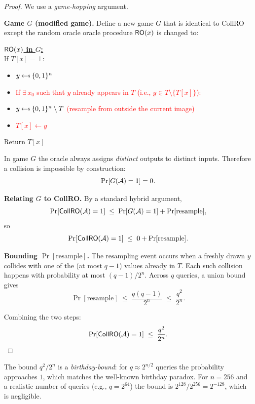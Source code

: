 \documentclass[11pt]{article}
\begin{document}
\begin{proof}
We use a \emph{game-hopping} argument.

\medskip
\noindent\textbf{Game $G$ (modified game).}
Define a new game $G$ that is identical to \textsf{CollRO} except the random
oracle oracle procedure $\mathsf{RO}(x)$ is changed to:

\begin{tcolorbox}[colback=gray!8, colframe=gray!50]
\textbf{\underline{$\mathsf{RO}(x)$ in $G$:}}\\
If $T[x] = \bot$:
\begin{itemize}[leftmargin=2em, topsep=2pt, itemsep=0pt]
  \item $y \getsr \{0,1\}^n$
  \item \textcolor{red}{If $\exists\, x_0$ such that $y$ already appears in
        $T$ (i.e., $y \in T \setminus \{T[x]\}$):}
  \item \textcolor{red}{\quad $y \getsr \{0,1\}^n \setminus T$ \quad
        (resample from outside the current image)}
  \item \textcolor{red}{\quad $T[x] \leftarrow y$}
\end{itemize}
Return $T[x]$
\end{tcolorbox}

\noindent In game $G$ the oracle always assigns \emph{distinct} outputs to
distinct inputs. Therefore a collision is impossible by construction:
\[
  \Pr[G(\mathcal{A}) = 1] = 0.
\]

\noindent\textbf{Relating $G$ to \textsf{CollRO}.}
By a standard hybrid argument,
\[
  \Pr[\textsf{CollRO}(\mathcal{A}) = 1]
  \;\le\;
  \Pr[G(\mathcal{A}) = 1] + \Pr[\text{resample}],
\]
so
\[
  \Pr[\textsf{CollRO}(\mathcal{A}) = 1] \;\le\; 0 + \Pr[\text{resample}].
\]

\noindent\textbf{Bounding $\Pr[\text{resample}]$.}
The resampling event occurs when a freshly drawn $y$ collides with one of the
(at most $q-1$) values already in $T$.  Each such collision happens with
probability at most $(q-1)/2^n$.  Across $q$ queries, a union bound gives
\[
  \Pr[\text{resample}] \;\le\; \frac{q(q-1)}{2^n} \;\le\; \frac{q^2}{2^n}.
\]

\noindent Combining the two steps:
\[
  \Pr[\textsf{CollRO}(\mathcal{A}) = 1]
  \;\le\;
  \frac{q^2}{2^n}. \qedhere
\]
\end{proof}

\begin{remark}
The bound $q^2/2^n$ is a \emph{birthday-bound}: for $q \approx 2^{n/2}$
queries the probability approaches $1$, which matches the well-known birthday
paradox.  For $n = 256$ and a realistic number of queries (e.g., $q = 2^{64}$)
the bound is $2^{128}/2^{256} = 2^{-128}$, which is negligible.
\end{remark}
\end{document}
